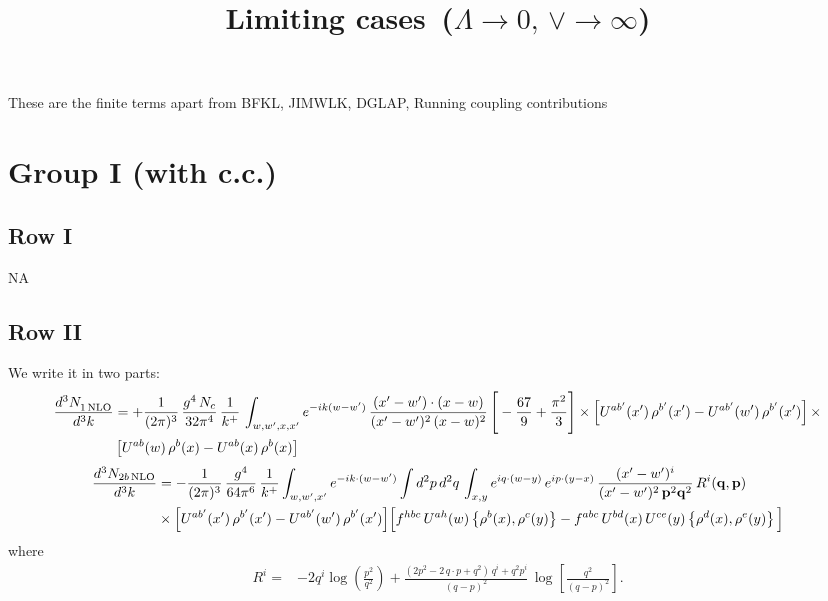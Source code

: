 \documentclass[9pt]{article}
\title{Limiting cases\, ($\Lambda\to 0,\, \vee \to \infty$)}
\author{}
\date{}
\numberwithin{equation}{section}
\begin{document}
\maketitle
These are the finite terms apart from BFKL, JIMWLK, DGLAP, Running coupling contributions
\section{Group I (with c.c.)}
\subsection{Row I}
\textsc{NA}
\subsection{Row II}
We write it in two parts:
\begin{align}
     \frac{d^{3}N_{1\,\rm NLO}^{\rm}}{d^{3}k} &  =  +\frac{1}{(2\pi)^{3}}\, \frac{g^{4}\,N_{c}}{32\pi^{4}}\,\frac{1}{k^{+}}\, \int_{w, w',x,x'} e^{-ik(w-w^\prime)}\, \frac{(x'-w')\cdot (x-w)}{(x'-w')^{2}\, (x-w)^{2}}\, \Bigg[ -\frac{67}{9}+\frac{\pi^{2}}{3}\Bigg]\times \left[U^{ab'}(x')\,\rho^{b'}(x') - U^{ab'}(w')\,\rho^{b'}(x')\right]\times\notag \\ & \left[U^{ab}(w)\,\rho^{b}(x) - U^{ab}(x)\,\rho^{b}(x)\right]
\end{align}
\begin{align}
\frac{d^{3}N_{2b\,\rm NLO}}{d^{3}k} & = -\frac{1}{(2\pi)^{3}}\,\frac{g^{4}}{64\pi^{6}}\,\frac{1}{k^{+}}\int_{w,w',x'} e^{-ik\cdot(w-w')}
\int d^{2}p\,d^{2}q\,\int_{x,y} e^{iq\cdot(w-y)}\,e^{ip\cdot(y-x)}\,\frac{(x'-w')^{i}}{(x'-w')^{2}\,\mathbf{p}^{2}\mathbf{q}^{2}}\,R^{i}(\mathbf{q},\mathbf{p})\notag\\
&\times\Big[U^{ab'}(x')\,\rho^{b'}(x')-U^{ab'}(w')\,\rho^{b'}(x')\Big]
\Big[f^{hbc}\,U^{ah}(w)\left\{\rho^{b}(x),\rho^{c}(y)\right\}-f^{abc}\,U^{bd}(x)\,U^{ce}(y)\left\{\rho^{d}(x),\rho^{e}(y)\right\}\Big]
\end{align}
where
\begin{align}
R^{i} =& -2q^{i}\log\left(\frac{p^{2}}{q^{2}}\right)
+\frac{(2p^{2}-2\,q\cdot p+q^{2})\,q^{i}+q^{2}p^{i}}{(q-p)^{2}}\,
\log\left[\frac{q^{2}}{(q-p)^{2}}\right].
\end{align}
\end{document}
